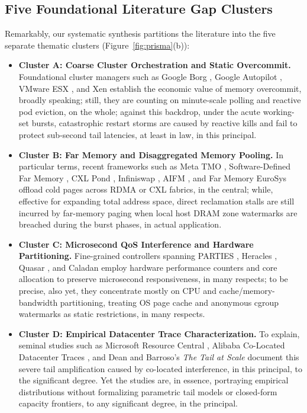 \documentclass[pdflatex,sn-mathphys,Numbered]{sn-jnl}
\begin{document}
\subsection{Five Foundational Literature Gap Clusters}
Remarkably, our systematic synthesis partitions the literature into the five separate thematic clusters (Figure~\ref{fig:prisma}(b)):
\begin{itemize}
    \item \textbf{Cluster A: Coarse Cluster Orchestration and Static Overcommit.} Foundational cluster managers such as Google Borg \cite{verma2015borg, tirmazi2020borg}, Google Autopilot \cite{rzadca2020autopilot}, VMware ESX \cite{waldspurger2002esx}, and Xen \cite{barham2003xen} establish the economic value of memory overcommit, broadly speaking; still, they are counting on minute-scale polling and reactive pod eviction, on the whole; against this backdrop, under the acute working-set bursts, catastrophic restart storms are caused by reactive kills and fail to protect sub-second tail latencies, at least in law, in this principal.
    \item \textbf{Cluster B: Far Memory and Disaggregated Memory Pooling.} In particular terms, recent frameworks such as Meta TMO \cite{weiner2022tmo}, Software-Defined Far Memory \cite{lagarcavilla2019far}, CXL Pond \cite{li2023pond}, Infiniswap \cite{gu2017infiniswap}, AIFM \cite{ruan2020aifm}, and Far Memory EuroSys \cite{amaro2020far} offload cold pages across RDMA or CXL fabrics, in the central; while, effective for expanding total address space, direct reclamation stalls are still incurred by far-memory paging when local host DRAM zone watermarks are breached during the burst phases, in actual application.
    \item \textbf{Cluster C: Microsecond QoS Interference and Hardware Partitioning.} Fine-grained controllers spanning PARTIES \cite{chen2019parties}, Heracles \cite{lo2015heracles}, Quasar \cite{delimitrou2014quasar}, and Caladan \cite{marinos2019caladan} employ hardware performance counters and core allocation to preserve microsecond responsiveness, in many respects; to be precise, also yet, they concentrate mostly on CPU and cache/memory-bandwidth partitioning, treating OS page cache and anonymous cgroup watermarks as static restrictions, in many respects.
    \item \textbf{Cluster D: Empirical Datacenter Trace Characterization.} To explain, seminal studies such as Microsoft Resource Central \cite{cortez2017resourcecentral}, Alibaba Co-Located Datacenter Traces \cite{cheng2018alibaba}, and Dean and Barroso's \textit{The Tail at Scale} \cite{dean2013tailatscale} document this severe tail amplification caused by co-located interference, in this principal, to the significant degree. Yet the studies are, in essence, portraying empirical distributions without formalizing parametric tail models or closed-form capacity frontiers, to any significant degree, in the principal.

\end{itemize}
\end{document}
